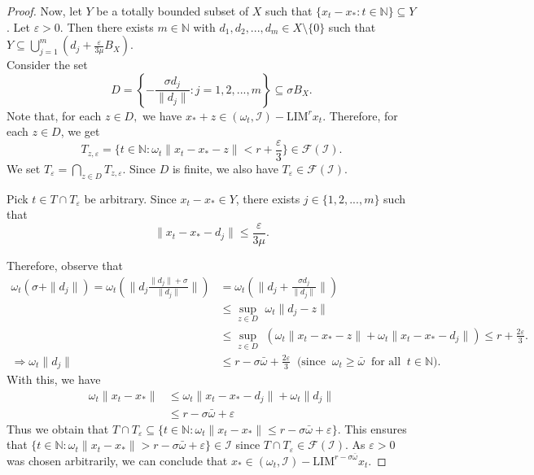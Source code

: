 \documentclass[reqno]{amsart}
\begin{document}
{\begin{proof}
Now, let $Y$ be a totally bounded subset of $X$ such that $\{x_t-x_*: t\in\mathbb{N}\}\subseteq Y$. Let $\varepsilon>0$. Then there exists $m\in\mathbb{N}$ with $d_1,d_2,...,d_m\in X\setminus \{0\}$ such that $Y\displaystyle\subseteq \bigcup_{j=1}^{m} (d_j+ \frac{\varepsilon}{3\mu}{B}_X)$.\\
	Consider the set $$
	D=\left \{-\frac{\sigma d_j}{\|d_j\|}:j=1,2,...,m \right\} \subseteq \displaystyle \sigma B_X.
	$$
	Note that, for each $z\in D,$ we have $x_*+z\in (\omega_t, \mathcal{I})-\text{LIM}^r x_t$. Therefore, for each $z\in D$, we get
	$$
	T_{z,\varepsilon}=\{t\in\mathbb{N}: \omega_t\|x_t-x_*-z\|<r+\frac{\varepsilon}{3}\}\in \mathcal{F}(\mathcal{I}).
	$$
	We set $T_\varepsilon=\displaystyle\bigcap_{z\in D} T_{z,\varepsilon}$. Since $D$ is finite, we also have  $T_\varepsilon\in \mathcal{F}(\mathcal{I})$.
	
	Pick $t \in T\cap  T_{\varepsilon}$ be arbitrary.  Since $x_t-x_*\in Y$, there exists $j\in \{1,2,...,m\}$ such that 
	 $$\|x_t-x_*-d_j\|\leq \frac{\varepsilon}{3\mu}.$$ 
	 
	Therefore, observe that
	\begin{align*}
		\omega_t(\sigma+\|d_j\|)=\omega_t(\|d_j \frac{\|d_j\|+\sigma}{\|d_j\|} \|)&=\omega_t(\|d_j+\frac{\sigma d_j}{\|d_j\|}\|)\\
		&\leq \sup_{z\in D} \mbox{~} \omega_t\|d_j-z\|\\
		&\leq  \sup_{z\in D} \mbox{~} (\omega_t\|x_t-x_*-z\|+\omega_t\|x_t-x_*-d_j\|)\leq r+ \frac{2\varepsilon}{3}.\\
		\Rightarrow \omega_t\|d_j\|&\leq r-\sigma\bar\omega +  \frac{2\varepsilon}{3}~\mbox{ (since }~ \omega_t\geq\bar\omega~\mbox{ for all }~ t\in\mathbb{N}).
	\end{align*}
	 With this, we have
	\begin{align*}
		\omega_t\|x_t-x_*\|&\leq \omega_t\|x_t-x_*-d_j\| + \omega_t\|d_j\|\\
		&\leq r-\sigma\bar\omega +\varepsilon
	\end{align*}
	Thus we obtain that $ T\cap  T_{\varepsilon}\subseteq\{t\in\mathbb{N}: \omega_t\|x_t-x_*\|\leq r-\sigma\bar\omega +\varepsilon \}$. This ensures that $\{t\in\mathbb{N}: \omega_t\|x_t-x_*\|> r-\sigma\bar\omega +\varepsilon\}\in\mathcal{I}$ since $T\cap  T_{\varepsilon}\in \mathcal{F}(\mathcal{I})$.
As $\varepsilon>0$ was chosen arbitrarily, we can conclude that $x_*\in (\omega_t,\mathcal{I})-\text{LIM}^{r-\sigma\bar\omega} x_t$. 
\end{proof}
   
}
\end{document}
